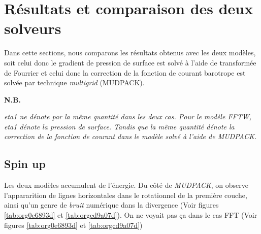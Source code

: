 \documentclass[10pt]{article}
\numberwithin{equation}{section}
\newcommand{\nb}{\textbf{N.B.}\hspace{4pt}}
\begin{document}
\section{Résultats et comparaison des deux solveurs}
\label{sec:org25bb08a}
Dans cette sections, nous comparons les résultats obtenus avec les deux modèles, soit celui donc le gradient de pression de surface est solvé à l'aide de transformée de Fourrier et celui donc la correction de la fonction de courant barotrope est solvée par technique \emph{multigrid} (MUDPACK).\bigskip

\nb\begin{minipage}[t]{0.9\linewidth}
\itshape 
eta1 ne dénote par la même quantité dans les deux cas.
Pour le modèle FFTW, eta1 dénote la pression de surface.
Tandis que la même quantité dénote la correction de la fonction de courant dans le modèle solvé à l'aide de MUDPACK.   
\end{minipage}


\subsection{Spin up}
\label{sec:org9b7ca61}
Les deux modèles accumulent de l'énergie.
Du côté de \emph{MUDPACK}, on observe l'appararition de lignes horizontales dans le rotationnel de la première couche, ainsi qu'un genre de \emph{bruit} numérique dans la divergence (Voir figures \ref{tab:org0e6893d} et \ref{tab:orgcd9a07d}).
On ne voyait pas ça dans le cas FFT (Voir figures \ref{tab:org0e6893d} et \ref{tab:orgcd9a07d})
\end{document}
